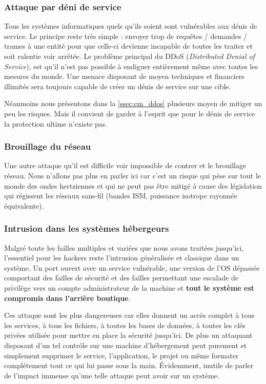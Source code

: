 \documentclass[12pt]{article}
\begin{document}
\subsubsection{Attaque par déni de service}

Tous les systèmes informatiques quels qu'ils soient sont vulnérables aux dénis de service. Le principe reste très simple : envoyer trop de requêtes / demandes / trames à une entité pour que celle-ci devienne incapable de toutes les traiter et soit ralentie voir arrêtée. Le problème principal du DDoS (\emph{Distributed Denial of Service}), est qu'il n'est pas possible à endiguer entièrement même avec toutes les mesures du monde. Une menace disposant de moyen techniques et financiers illimités sera toujours capable de créer un dénis de service sur une cible.

Néanmoins nous présentons dans la \autoref{ssec:cm_ddos} plusieurs moyen de mitiger un peu les risques. Mais il convient de garder à l'esprit que pour le dénis de service la protection ultime n'existe pas.

\subsubsection{Brouillage du réseau}

Une autre attaque qu'il est difficile voir impossible de contrer et le brouillage réseau. Nous n'allons pas plus en parler ici car c'est un risque qui pèse sur tout le monde des ondes hertziennes et qui ne peut pas être mitigé à cause des législation qui régissent les réseaux sans-fil (bandes ISM, puissance isotrope rayonnée équivalente).

\subsubsection{Intrusion dans les systèmes hébergeurs}

Malgré toute les failles multiples et variées que nous avons traitées jusqu'ici, l'essentiel pour les hackers reste l'intrusion généralisée et classique dans un système. Un port ouvert avec un service vulnérable, une version de l'OS dépassée comportant des failles de sécurité et des failles permettant une escalade de privilège vers un compte administrateur de la machine et \textbf{tout le système est compromis dans l'arrière boutique}. 

Ces attaque sont les plus dangereuses car elles donnent un accès complet à tous les services, à tous les fichiers, à toutes les bases de données, à toutes les clés privées utilisée pour mettre en place la sécurité jusqu'ici. De plus un attaquant disposant d'un tel contrôle sur une machine d'hébergement peut purement et simplement supprimer le service, l'application, le projet ou même formater complétement tout ce qui lui passe sous la main.  Évidemment, inutile de parler de l'impact immense qu'une telle attaque peut avoir sur un système.
\end{document}
